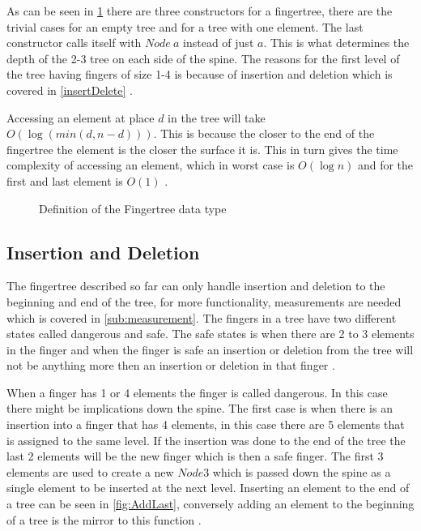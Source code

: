 As can be seen in \cref{fig:DataTypeFingertree} there are three constructors
for a fingertree, there are the trivial cases for an empty tree and for a tree
with one element. The last constructor calls itself with $Node~a$ instead of
just $a$. This is what determines the depth of the 2-3 tree on each side of the
spine. The reasons for the first level of the tree having fingers of size 1-4 is
because of insertion and deletion which is covered in \cref{insertDelete} \cite{fingertree}.

Accessing an element at place $d$ in the tree will take $O(\log(min(d,n-d)))$. This
is because the closer to the end of the fingertree the element is the closer the
surface it is. This in turn gives the time complexity of accessing an element,
which in worst case is $O(\log n)$ and for the first and last element is $O(1)$
\cite{fingertree}.

\begin{figure}[h!]

\caption{Definition of the Fingertree data type \label{fig:DataTypeFingertree}\cite{fingertree}}
\end{figure}

\subsection{Insertion and Deletion \label{insertDelete}}
The fingertree described so far can only handle insertion and deletion to the
beginning and end of the tree, for more functionality, measurements are needed
which is covered in \cref{sub:measurement}.
The fingers in a tree have two different states called dangerous and safe. The
safe states is when there are 2 to 3 elements in the finger and when the finger
is safe an insertion or deletion from the tree will not be anything more then an
insertion or deletion in that finger \cite{fingertree}.

When a finger has 1 or 4 elements the finger is called dangerous. In this case
there might be implications down the spine. The first case is when there is an
insertion into a finger that has 4 elements, in this case there are 5 elements
that is assigned to the same level. If the insertion was done to the end of the
tree the last 2 elements will be the new finger which is then a safe finger. The
first 3 elements are used to create a new $Node3$ which is passed down the spine
as a single element to be inserted at the next level. Inserting an element to
the end of a tree can be seen in \cref{fig:AddLast}, conversely adding an element
to the beginning of a tree is the mirror to this function \cite{fingertree}.

